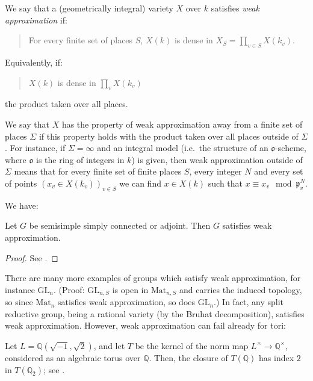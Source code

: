\begin{definition}
 \label{definition-weak-approximation}
We say that a (geometrically integral) variety $X$ over $k$ satisfies {\it weak approximation} if:
\begin{quote}
 For every finite set of places $S$,  $X(k)$ is dense in $X_S=\prod_{v\in S} X(k_v)$.
\end{quote}
Equivalently, if:
\begin{quote}
 $X(k)$ is dense in $\prod_v X(k_v)$
\end{quote}
the product taken over all places. 

We say that $X$ has the property of weak approximation away from a finite set of places $\Sigma$ if this property holds with the product taken over all places outside of $\Sigma$. For instance, if $\Sigma=\infty$ and an integral model (i.e.\ the structure of an $\mathfrak o$-scheme, where $\mathfrak o$ is the ring of integers in $k$) is given, then weak approximation outside of $\Sigma$ means that for every finite set of finite places $S$, every integer $N$ and every set of points $(x_v \in X(k_v))_{v\in S}$ we can find $x\in X(k)$ such that $x\equiv x_v \mod \mathfrak p_v^N$.
\end{definition}

We have:
\begin{theorem}
\label{theorem-weak-approximation}
 Let $G$ be semisimple simply connected or adjoint. Then $G$ satisfies weak approximation.
\end{theorem}

\begin{proof}
 See \cite[Theorem 7.8]{Platonov-Rapinchuk}.
\end{proof}

There are many more examples of groups which satisfy weak approximation, for instance $\text{GL}_n$. (Proof: $\text{GL}_{n,S}$ is open in $\text{Mat}_{n,S}$ and carries the induced topology, so since $\text{Mat}_n$ satisfies weak approximation, so does $\text{GL}_n$.) In fact, any split reductive group, being a rational variety (by the Bruhat decomposition), satisfies weak approximation. However, weak approximation can fail already for tori:

\begin{example}
 \label{example-failure-weak-approximation}
Let $L = \mathbb Q(\sqrt{-1},\sqrt{2})$, and let $T$ be the kernel of the norm map $L^\times \to \mathbb Q^\times$, considered as an algebraic torus over $\mathbb Q$. Then, the closure of $T(\mathbb Q)$ has index $2$ in $T(\mathbb Q_2)$; see \cite[p.423]{Platonov-Rapinchuk}.
\end{example}


